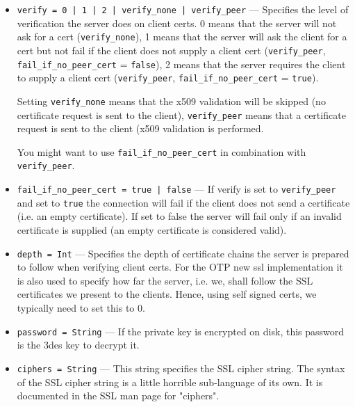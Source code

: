 \documentclass[11pt,oneside,english]{book}
\begin{document}
\begin{itemize}
\begin{itemize}
               \item \verb+verify = 0 | 1 | 2 | verify_none | verify_peer+ ---
                 Specifies the level of verification the server does on client
                 certs. 0 means that the server will not ask for a cert
                 (\verb+verify_none+), 1 means that the server will ask the
                 client for a cert but not fail if the client does not supply a
                 client cert (\verb+verify_peer+, \verb+fail_if_no_peer_cert+ =
                 \verb+false+), 2 means that the server requires the client to
                 supply a client cert (\verb+verify_peer+,
                 \verb+fail_if_no_peer_cert+ = \verb+true+).

                 Setting \verb+verify_none+ means that the x509 validation will
                 be skipped (no certificate request is sent to the client),
                 \verb+verify_peer+ means that a certificate request is sent to
                 the client (x509 validation is performed.

                 You might want to use \verb+fail_if_no_peer_cert+ in
                 combination with \verb+verify_peer+.

               \item \verb+fail_if_no_peer_cert = true | false+ --- If verify is
                 set to \verb+verify_peer+ and set to \verb+true+ the connection
                 will fail if the client does not send a certificate (i.e. an
                 empty certificate). If set to false the server will fail only
                 if an invalid certificate is supplied (an empty certificate is
                 considered valid).

               \item \verb+depth = Int+ --- Specifies the depth of certificate
                 chains the server is prepared to follow when verifying client
                 certs. For the OTP new ssl implementation it is also used to
                 specify how far the server, i.e. we, shall follow the SSL
                 certificates we present to the clients. Hence, using self
                 signed certs, we typically need to set this to 0.

               \item \verb+password = String+ --- If the private key is
                 encrypted on disk, this password is the 3des key to decrypt it.

               \item \verb+ciphers = String+ --- This string specifies the SSL
                 cipher string.  The syntax of the SSL cipher string is a little
                 horrible sub-language of its own.  It is documented in the SSL
                 man page for "ciphers".
               \end{itemize}


\end{itemize}
\end{document}
